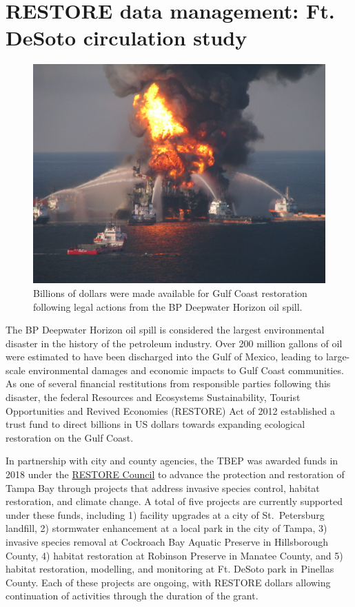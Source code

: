 \documentclass[
]{book}
\begin{document}
\hypertarget{desoto}{%
\section{RESTORE data management: Ft. DeSoto circulation study}\label{desoto}}

\begin{figure}

{\centering \includegraphics[width=0.7\linewidth]{img/deepwater} 

}

\caption{Billions of dollars were made available for Gulf Coast restoration following legal actions from the BP Deepwater Horizon oil spill.}\label{fig:unnamed-chunk-13}
\end{figure}

The BP Deepwater Horizon oil spill is considered the largest environmental disaster in the history of the petroleum industry. Over 200 million gallons of oil were estimated to have been discharged into the Gulf of Mexico, leading to large-scale environmental damages and economic impacts to Gulf Coast communities. As one of several financial restitutions from responsible parties following this disaster, the federal Resources and Ecosystems Sustainability, Tourist Opportunities and Revived Economies (RESTORE) Act of 2012 established a trust fund to direct billions in US dollars towards expanding ecological restoration on the Gulf Coast.

In partnership with city and county agencies, the TBEP was awarded funds in 2018 under the \href{https://www.restorethegulf.gov/}{RESTORE Council} to advance the protection and restoration of Tampa Bay through projects that address invasive species control, habitat restoration, and climate change. A total of five projects are currently supported under these funds, including 1) facility upgrades at a city of St.~Petersburg landfill, 2) stormwater enhancement at a local park in the city of Tampa, 3) invasive species removal at Cockroach Bay Aquatic Preserve in Hillsborough County, 4) habitat restoration at Robinson Preserve in Manatee County, and 5) habitat restoration, modelling, and monitoring at Ft. DeSoto park in Pinellas County. Each of these projects are ongoing, with RESTORE dollars allowing continuation of activities through the duration of the grant.
\end{document}
